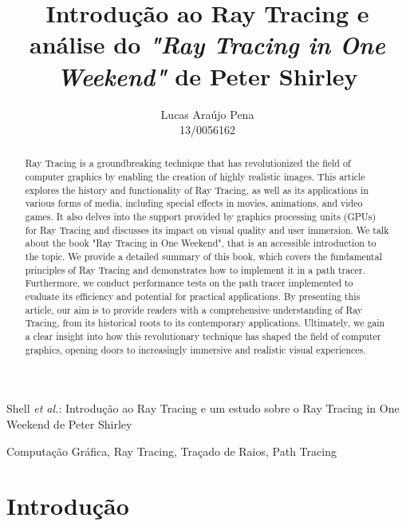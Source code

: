 \documentclass[journal]{IEEEtran}
\begin{document}
\title{Introdução ao Ray Tracing e análise do \emph{"Ray Tracing in One Weekend"} de Peter Shirley}

\author{ Lucas Araújo Pena \\ 
         13/0056162 }

%
{Shell \MakeLowercase{\textit{et al.}}: Introdução ao Ray Tracing e um estudo sobre o Ray Tracing in One Weekend de Peter Shirley}

\maketitle

\begin{abstract}
  Ray Tracing is a groundbreaking technique that has revolutionized the field of computer 
  graphics by enabling the creation of highly realistic images. This article explores the 
  history and functionality of Ray Tracing, as well as its applications in various forms of 
  media, including special effects in movies, animations, and video games. It also delves into the support 
  provided by graphics processing units (GPUs) for Ray Tracing and discusses its impact on 
  visual quality and user immersion. We talk about the book "Ray Tracing in One Weekend", that is an accessible 
  introduction to the topic. We provide a detailed summary of this book, which covers the fundamental
  principles of Ray Tracing and demonstrates how to implement it in a path tracer. Furthermore, we 
  conduct performance tests on the path tracer implemented to evaluate its efficiency and potential for practical applications.
  By presenting this article, our aim is to provide readers with a comprehensive understanding of 
  Ray Tracing, from its historical roots to its contemporary applications. Ultimately, we gain a clear 
  insight into how this revolutionary technique has shaped the field of computer graphics, opening doors 
  to increasingly immersive and realistic visual experiences.
\end{abstract}


\begin{IEEEkeywords}
Computação Gráfica, Ray Tracing, Traçado de Raios, Path Tracing
\end{IEEEkeywords}

\section{Introdução}
\end{document}
